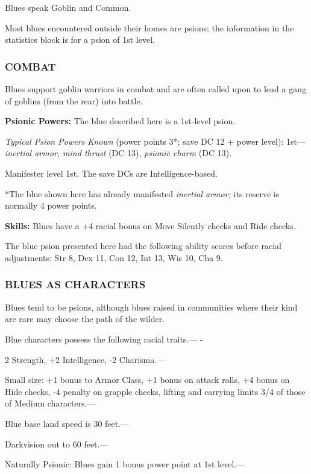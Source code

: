 \documentclass{article}
\begin{document}
Blues speak Goblin and Common.

Most blues encountered outside their homes are psions; the information in the statistics 
block is for a psion of 1st level.

\subsubsection*{COMBAT}

Blues support goblin warriors in combat and are often called upon to lead a gang 
of goblins (from the rear) into battle.

\textbf{Psionic Powers:} The blue described here is a 1st-level psion.

\textit{Typical Psion Powers Known }(power points 3*; save DC 12 + power level): 
1st---\textit{inertial armor, mind thrust }(DC 13), \textit{psionic charm }(DC 
13). 

Manifester level 1st. The save DCs are Intelligence-based.

*The blue shown here has already manifested \textit{inertial armor; }its reserve 
is normally 4 power points.

\textbf{Skills:} Blues have a +4 racial bonus on Move Silently checks and Ride 
checks.

The blue psion presented here had the following ability scores before racial adjustments: 
Str 8, Dex 11, Con 12, Int 13, Wis 10, Cha 9.

\subsubsection*{BLUES AS CHARACTERS}

Blues tend to be psions, although blues raised in communities where their kind 
are rare may choose the path of the wilder.

Blue characters possess the following racial traits.--- -

\parindent=3pt
2 Strength, +2 Intelligence, -2 Charisma.---

\parindent=0pt
Small size: +1 bonus to Armor Class, +1 bonus on attack rolls, +4 bonus on Hide 
checks, -4 penalty on grapple checks, lifting and carrying limits 3/4 of those 
of Medium characters.---

Blue base land speed is 30 feet.---

Darkvision out to 60 feet.---

Naturally Psionic: Blues gain 1 bonus power point at 1st level.--- 
\end{document}
